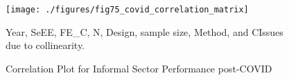 \documentclass[a4paper, 12pt]{article}
\begin{document}
    \begin{figure}[H]
        \centering
        \texttt{[image: ./figures/fig75\_covid\_correlation\_matrix]}
        \caption{Correlation Plot for Informal Sector Performance post-COVID}
        \label{fig23:corrplot-inform-sector-postcovid}
        \begin{minipage}{10cm}
            \vspace{.1cm}
            \small Year, SeEE, FE\_C, N, Design, sample size, Method, and CIssues due to collinearity.
        \end{minipage}
    \end{figure}

    \newpage
    \printbibliography
\end{document}
